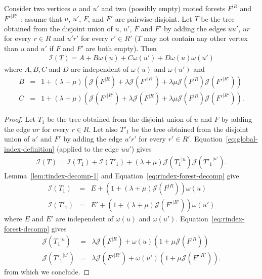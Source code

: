 \documentclass[11 pt]{modarticle}
\newcommand{\wmap}{\omega}
\newcommand{\rtree}[2]{{#1}^{\lvert #2}}
\newcommand{\indexsymbol}{\mathcal{I}}
\newcommand{\tindex}[1]{\indexsymbol(#1)}
\newcommand{\rindexsymbol}{\mathcal{J}}
\newcommand{\rindex}[2]{\rindexsymbol(\rtree{#2}{#1})}
\begin{document}
\begin{lem}\label{lem:tindex-decomp-3}
Consider two vertices $u$ and $u'$ and two (possibly empty) rooted forests $\rtree{F}{R}$ and $\rtree{F'}{R'}$ : assume that $u$, $u'$, $F$, and $F'$ are pairwise-disjoint. Let $T$ be the tree obtained from the disjoint union of $u$, $u'$, $F$ and $F'$ by adding the edges $uu'$, $ur$ for every $r \in R$ and $u'r'$ for every $r' \in R'$ ($T$ may not contain any other vertex than $u$ and $u'$ if $F$ and $F'$ are both empty). Then
\begin{eqnarray*}
	\tindex{T} = A + B \wmap(u) + C \wmap(u') + D \wmap(u) \wmap(u')
\end{eqnarray*}
where $A,B,C$ and $D$ are independent of $\wmap(u)$ and $\wmap(u')$ and
\begin{eqnarray*}
	B & = & 1 + (\lambda + \mu)\left( \rindex{R}{F} + \lambda \rindex{R'}{F'} + \lambda \mu \rindex{R}{F} \rindex{R'}{F'} \right) \\
	C & = & 1 + (\lambda + \mu)\left( \rindex{R'}{F'} + \lambda \rindex{R}{F} + \lambda \mu \rindex{R}{F} \rindex{R'}{F'} \right) .
\end{eqnarray*}
\end{lem}

\begin{proof}
Let $T_1$ be the tree obtained from the disjoint union of $u$ and $F$ by adding the edge $ur$ for every $r \in R$. Let also $T'_1$ be the tree obtained from the disjoint union of $u'$ and $F'$ by adding the edge $u'r'$ for every $r' \in R'$. Equation~\eqref{eq:global-index-definition} (applied to the edge $uu'$) gives
\begin{eqnarray*}
	\tindex{T} = \tindex{T_1} + \tindex{T'_1} + (\lambda + \mu) \rindex{u}{T_1} \rindex{u'}{T'_1}.
\end{eqnarray*}
Lemma~\ref{lem:tindex-decomp-1} and Equation~\eqref{eq:rindex-forest-decomp} give
\begin{eqnarray*}
	\tindex{T_1} & = & E + \left(1 + (\lambda + \mu)\rindex{R}{F}\right) \wmap(u) \\
	\tindex{T'_1} & = & E' + \left(1 + (\lambda + \mu)\rindex{R'}{F'}\right) \wmap(u')
\end{eqnarray*}
where $E$ and $E'$ are independent of $\wmap(u)$ and $\wmap(u')$. Equation~\eqref{eq:rindex-forest-decomp} gives
\begin{eqnarray*}
	\rindex{u}{T_1} & = & \lambda \rindex{R}{F} + \wmap(u)(1 + \mu \rindex{R}{F}) \\
	\rindex{u'}{T'_1} & = & \lambda \rindex{R'}{F'} + \wmap(u') (1 + \mu \rindex{R'}{F'}).
\end{eqnarray*}
from which we conclude.
\end{proof}
\end{document}

